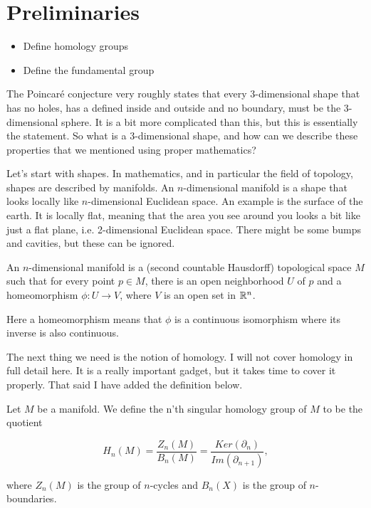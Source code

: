 

\section{Preliminaries}

\begin{itemize}
    \item Define homology groups
    \item Define the fundamental group
\end{itemize}

The Poincaré conjecture very roughly states that every 3-dimensional shape that has no holes, has a defined inside and outside and no boundary, must be the 3-dimensional sphere. 
It is a bit more complicated than this, but this is essentially the statement. 
So what is a 3-dimensional shape, and how can we describe these properties that we mentioned using proper mathematics? 

Let's start with shapes. 
In mathematics, and in particular the field of topology, shapes are described by manifolds. 
An $n$-dimensional manifold is a shape that looks locally like $n$-dimensional Euclidean space. 
An example is the surface of the earth. 
It is locally flat, meaning that the area you see around you looks a bit like just a flat plane, i.e. 2-dimensional Euclidean space. 
There might be some bumps and cavities, but these can be ignored. 

\begin{definition}
An $n$-dimensional manifold is a (second countable Hausdorff) topological space $M$ such that for every point $p\in M$, there is an open neighborhood $U$ of $p$ and a homeomorphism $\phi:U\longrightarrow V$, where $V$ is an open set in $\mathbb{R}^n$.
\end{definition}

Here a homeomorphism means that $\phi$ is a continuous isomorphism where its inverse is also continuous. 

The next thing we need is the notion of homology. 
I will not cover homology in full detail here.
It is a really important gadget, but it takes time to cover it properly. 
That said I have added the definition below.  

\begin{definition}
Let $M$ be a manifold. 
We define the n'th singular homology group of $M$ to be the quotient  

$$H_n(M) = \frac{Z_n(M)}{B_n(M)} = \frac{Ker(\partial_n)}{Im(\partial_{n+1})},$$

where $Z_n(M)$ is the group of $n$-cycles and $B_n(X)$ is the group of $n$-boundaries. 
\end{definition}



